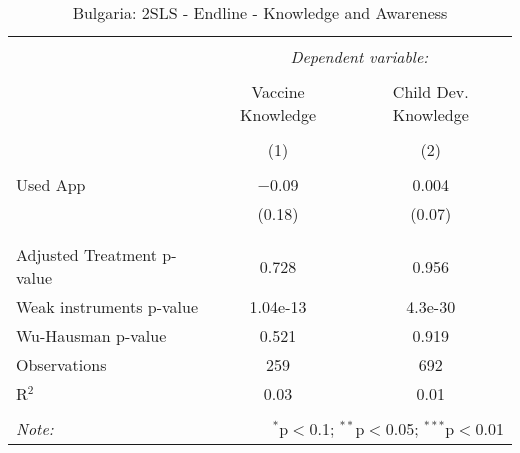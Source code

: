 
\begin{table}[!htbp] \centering 
  \caption{Bulgaria: 2SLS - Endline - Knowledge and Awareness} 
  \label{tbl:Bulgaria: 2SLS - Endline - Knowledge and Awareness} 
\begin{tabular}{@{\extracolsep{5pt}}lcc} 
\\[-1.8ex]\hline 
\hline \\[-1.8ex] 
 & \multicolumn{2}{c}{\textit{Dependent variable:}} \\ 
\cline{2-3} 
\\[-1.8ex] & Vaccine Knowledge & Child Dev. Knowledge \\ 
\\[-1.8ex] & (1) & (2)\\ 
\hline \\[-1.8ex] 
 Used App & $-$0.09 & 0.004 \\ 
  & (0.18) & (0.07) \\ 
  & & \\ 
\hline \\[-1.8ex] 
Adjusted Treatment p-value & 0.728 & 0.956 \\ 
Weak instruments p-value & 1.04e-13 & 4.3e-30 \\ 
Wu-Hausman p-value & 0.521 & 0.919 \\ 
Observations & 259 & 692 \\ 
R$^{2}$ & 0.03 & 0.01 \\ 
\hline 
\hline \\[-1.8ex] 
\textit{Note:}  & \multicolumn{2}{r}{$^{*}$p$<$0.1; $^{**}$p$<$0.05; $^{***}$p$<$0.01} \\ 
\end{tabular} 
\end{table} 
